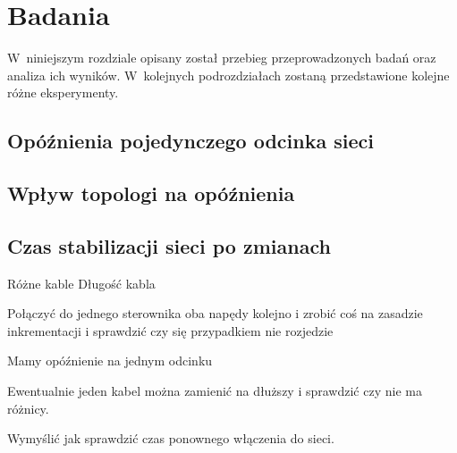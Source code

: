 \section{Badania}
W~niniejszym rozdziale opisany został przebieg przeprowadzonych badań oraz analiza ich wyników. W~kolejnych podrozdziałach zostaną przedstawione kolejne różne eksperymenty. 

\subsection{Opóźnienia pojedynczego odcinka sieci}
\subsection{Wpływ topologi na opóźnienia}
\subsection{Czas stabilizacji sieci po zmianach}

Różne kable
Długość kabla

Połączyć do jednego sterownika oba napędy kolejno i zrobić coś na zasadzie inkrementacji i sprawdzić czy się przypadkiem nie rozjedzie

Mamy opóźnienie na jednym odcinku

Ewentualnie jeden kabel można zamienić na dłuższy i sprawdzić czy nie ma różnicy.

Wymyślić jak sprawdzić czas ponownego włączenia do sieci.